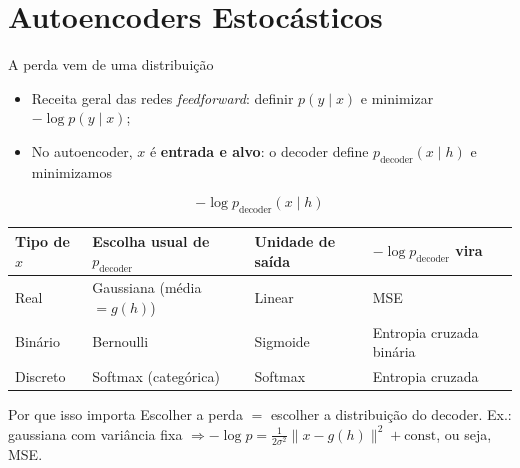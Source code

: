 \documentclass[aspectratio=169,xcolor=dvipsnames]{beamer}
\begin{document}
\section{Autoencoders Estocásticos}

\begin{frame}{A perda vem de uma distribuição}
    \begin{itemize}
        \item Receita geral das redes \textit{feedforward}: definir $p(y \mid x)$ e minimizar $-\log p(y \mid x)$;
        \item No autoencoder, $x$ é \textbf{entrada e alvo}: o decoder define $p_{\text{decoder}}(x \mid h)$ e minimizamos
    \end{itemize}
    \[
        -\log p_{\text{decoder}}(x \mid h)
    \]
    \centering
    \small
    \begin{tabular}{@{}llll@{}}
        \toprule
        \textbf{Tipo de $x$} & \textbf{Escolha usual de $p_{\text{decoder}}$} & \textbf{Unidade de saída} & \textbf{$-\log p_{\text{decoder}}$ vira} \\
        \midrule
        Real & Gaussiana (média $= g(h)$) & Linear & MSE \\
        Binário & Bernoulli & Sigmoide & Entropia cruzada binária \\
        Discreto & Softmax (categórica) & Softmax & Entropia cruzada \\
        \bottomrule
    \end{tabular}
    \vspace{0.2cm}
    \begin{block}{Por que isso importa}
        Escolher a perda $=$ escolher a distribuição do decoder. Ex.: gaussiana com variância fixa $\Rightarrow -\log p = \frac{1}{2\sigma^2}\lVert x - g(h) \rVert^2 + \text{const}$, ou seja, MSE.
    \end{block}
\end{frame}
 
\end{document}
